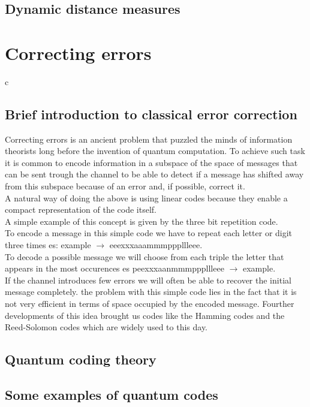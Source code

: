 \documentclass{article}
\begin{document}
\subsection{Dynamic distance measures}

\section{Correcting errors}
c
\subsection{Brief introduction to classical error correction}

Correcting errors is an ancient problem that puzzled the minds of
information theorists long before the invention of quantum computation.
To achieve such task it is common to encode information in a subspace of
the space of messages that can be sent trough the channel to be able to
detect if a message has shifted away from this subspace because of an
error and, if possible, correct it.\\
A natural way of doing the above is using linear codes because they
enable a compact representation of the code itself.\\
A simple example of this concept is given by the three bit repetition
code.\\
To encode a message in this simple code we have to repeat each letter
or digit three times es: example $\rightarrow$ eeexxxaaammmpppllleee.\\
To decode a possible message we will choose from each triple the
letter that appears in the most occurences es peexxxaanmmmpppllleee $\rightarrow$ example. \\
If the channel introduces few errors we will often be able to recover
the initial message completely.
the problem with this simple code lies in the fact that it is not very
efficient in terms of space occupied by the encoded message.
Fourther developments of this idea brought us codes like the Hamming
codes and the Reed-Solomon codes which are widely used to this day.




\subsection{Quantum coding theory}

\subsection{Some examples of quantum codes}
\end{document}
